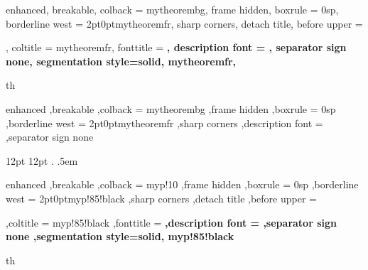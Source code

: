 \allowdisplaybreaks

\hypersetup{
	colorlinks=true,
	linkcolor=black,
	filecolor=magenta,
	urlcolor=secondaryBlue,
}


\setlength{\parindent}{1cm}

{%
	enhanced,
	breakable,
	colback = mytheorembg,
	frame hidden,
	boxrule = 0sp,
	borderline west = {2pt}{0pt}{mytheoremfr},
	sharp corners,
	detach title,
	before upper = \tcbtitle\par\smallskip,
	coltitle = mytheoremfr,
	fonttitle = \bfseries\sffamily,
	description font = \mdseries,
	separator sign none,
	segmentation style={solid, mytheoremfr},
}
{th}

{%
	enhanced
	,breakable
	,colback = mytheorembg
	,frame hidden
	,boxrule = 0sp
	,borderline west = {2pt}{0pt}{mytheoremfr}
	,sharp corners
	,description font = \mdseries
	,separator sign none
}

\newtheorem{remark}{Remark}[section]

\newtheorem{example}{Example}[section]

{12pt} {12pt} %
{\normalfont} %
{}            %
{\bfseries}   %
{.}           %
{.5em}        %
{}            %

\theoremstyle{simple_property}
\newtheorem{propertyInternal}{Property}[section]

\newenvironment{property}[2]
{\begin{propertyInternal}[#1]\label{prop:#2}\leavevmode}
	{\end{propertyInternal}}

{%
	enhanced
	,breakable
	,colback = myp!10
	,frame hidden
	,boxrule = 0sp
	,borderline west = {2pt}{0pt}{myp!85!black}
	,sharp corners
	,detach title
	,before upper = \tcbtitle\par\smallskip
	,coltitle = myp!85!black
	,fonttitle = \bfseries\sffamily
	,description font = \mdseries
	,separator sign none
	,segmentation style={solid, myp!85!black}
}
{th}

